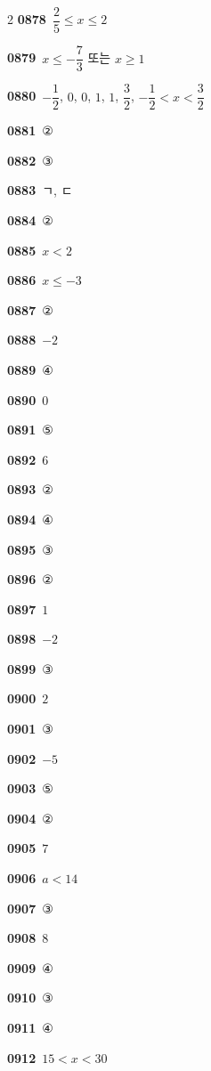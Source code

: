 \documentclass[10pt,a4paper]{article}
\begin{document}
\begin{multicols}{2}
\noindent\textbf{0878}\ $\dfrac{2}{5}\le x\le 2$\par
\noindent\textbf{0879}\ $x\le -\dfrac{7}{3}$ 또는 $x\ge 1$\par
\noindent\textbf{0880}\ $-\dfrac{1}{2}$, $0$, $0$, $1$, $1$, $\dfrac{3}{2}$, $-\dfrac{1}{2}<x<\dfrac{3}{2}$\par
\noindent\textbf{0881}\ ②\par
\noindent\textbf{0882}\ ③\par
\noindent\textbf{0883}\ ㄱ, ㄷ\par
\noindent\textbf{0884}\ ②\par
\noindent\textbf{0885}\ $x<2$\par
\noindent\textbf{0886}\ $x\le -3$\par
\noindent\textbf{0887}\ ②\par
\noindent\textbf{0888}\ $-2$\par
\noindent\textbf{0889}\ ④\par
\noindent\textbf{0890}\ $0$\par
\noindent\textbf{0891}\ ⑤\par
\noindent\textbf{0892}\ $6$\par
\noindent\textbf{0893}\ ②\par
\noindent\textbf{0894}\ ④\par
\noindent\textbf{0895}\ ③\par
\noindent\textbf{0896}\ ②\par
\noindent\textbf{0897}\ $1$\par
\noindent\textbf{0898}\ $-2$\par
\noindent\textbf{0899}\ ③\par
\noindent\textbf{0900}\ $2$\par
\noindent\textbf{0901}\ ③\par
\noindent\textbf{0902}\ $-5$\par
\noindent\textbf{0903}\ ⑤\par
\noindent\textbf{0904}\ ②\par
\noindent\textbf{0905}\ $7$\par
\noindent\textbf{0906}\ $a<14$\par
\noindent\textbf{0907}\ ③\par
\noindent\textbf{0908}\ $8$\par
\noindent\textbf{0909}\ ④\par
\noindent\textbf{0910}\ ③\par
\noindent\textbf{0911}\ ④\par
\noindent\textbf{0912}\ $15<x<30$\par

\end{multicols}
\end{document}
